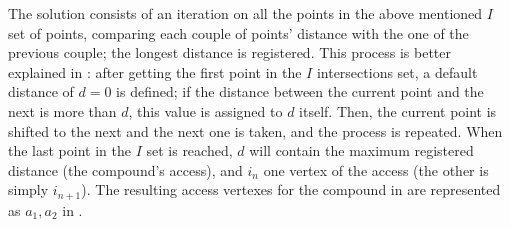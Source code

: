                 The solution consists of an iteration on all the points in the above mentioned $I$ set of points, comparing each couple of points' distance with the one of the previous couple; the longest distance is registered. This process is better explained in : after getting the first point in the $I$ intersections set, a default distance of $d=0$ is defined; if the distance between the current point and the next is more than $d$, this value is assigned to $d$ itself. Then, the current point is shifted to the next and the next one is taken, and the process is repeated. When the last point in the $I$ set is reached, $d$ will contain the maximum registered distance (the compound's access), and $i_n$ one vertex of the access (the other is simply $i_{n+1}$). The resulting access vertexes for the compound in  are represented as $a_1, a_2$ in .

